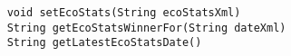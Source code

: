 \begin{verbatim}
    void setEcoStats(String ecoStatsXml)
    String getEcoStatsWinnerFor(String dateXml)
    String getLatestEcoStatsDate()
\end{verbatim}